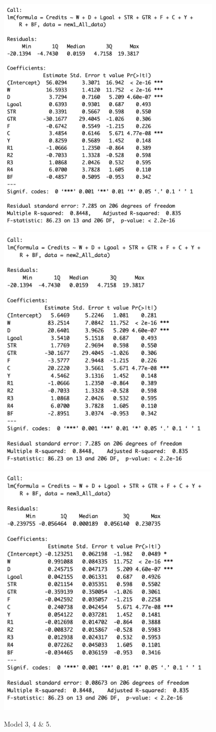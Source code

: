 \documentclass[12pt]{article}
\begin{document}
\begin{figure}[h]
    \centering
    \includegraphics[width=0.32\linewidth]{m3.png}
    \includegraphics[width=0.32\linewidth]{m4.png}
    \includegraphics[width=0.32\linewidth]{m5.png}
    \caption{Model 3, 4 \& 5.}
\end{figure}

\newpage
\end{document}
